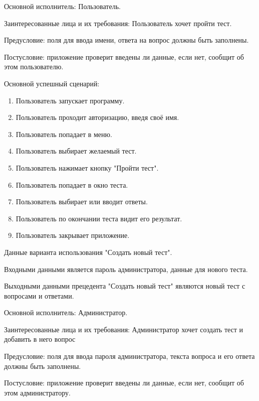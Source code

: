 Основной исполнитель: Пользователь.

Заинтересованные лица и их требования: Пользователь хочет пройти тест.

Предусловие: поля для ввода имени, ответа на вопрос должны быть заполнены.

Постусловие: приложение проверит введены ли данные, если нет, сообщит об этом пользователю.

Основной успешный сценарий:
\begin{enumerate}
	\item Пользователь запускает программу.
	\item Пользователь проходит авторизацию, введя своё имя.
	\item Пользователь попадает в меню.
	\item Пользователь выбирает желаемый тест.
	\item Пользователь нажимает кнопку "Пройти тест".
	\item Пользователь попадает в окно теста.
	\item Пользователь выбирает или вводит ответы.
	\item Пользователь по окончании теста видит его результат.
	\item Пользователь закрывает приложение.
\end{enumerate}

Данные варианта использования "Создать новый тест".

Входными данными является пароль администратора, данные для нового теста.

Выходными данными прецедента "Создать новый тест" являются новый тест с вопросами и ответами.

Основной исполнитель: Администратор.

Заинтересованные лица и их требования: Администратор хочет создать тест и добавить в него вопрос

Предусловие: поля для ввода пароля администратора, текста вопроса и его ответа должны быть заполнены.

Постусловие: приложение проверит введены ли данные, если нет, сообщит об этом администратору.

